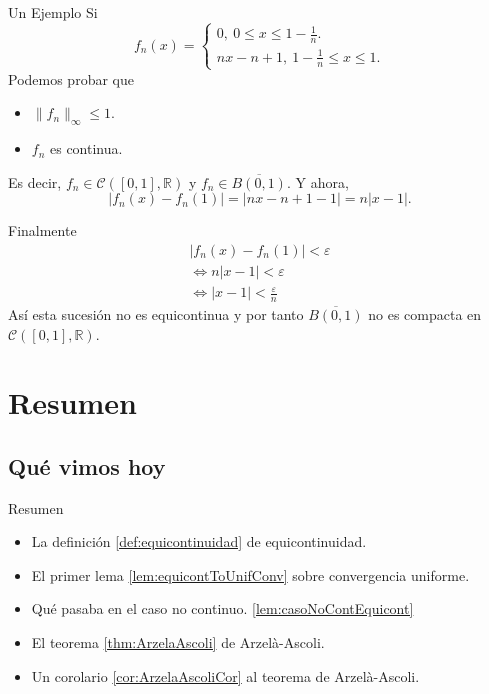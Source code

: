 \documentclass[utf8]{beamer}
\theoremstyle{plain}
\theoremstyle{definition}
\theoremstyle{remark}
\numberwithin{equation}{section}
\newcommand{\eps}{\varepsilon}          %
\newcommand{\bR}{\mathbb{R}}    %
\newcommand{\cC}{\mathcal{C}}           %
\renewcommand{\leq}{\leqslant}          %
\newcommand{\ov}{\overline}
\begin{document}
\begin{frame}{Un Ejemplo}
  Si 
$$f_n(x)=\begin{cases}
  0,\ 0\leq x\leq 1-\frac1n.\\
  nx-n+1,\ 1-\frac1n\leq x\leq 1.
\end{cases}$$
Podemos probar que

\begin{itemize}
  \item $\|f_n\|_\infty\leq 1$.
  \item $f_n$ es continua.
\end{itemize}

Es decir, $f_n\in \cC([0,1],\bR)$ y $f_n\in\ov{B(0,1)}$. Y ahora,
$$|f_n(x)-f_n(1)|=|nx-n+1-1|=n|x-1|.$$
\end{frame}

\begin{frame}
  Finalmente
  \begin{gather*}
    |f_n(x)-f_n(1)|<\eps\\
    \iff n|x-1|<\eps\\
    \iff |x-1|<\frac\eps n
  \end{gather*}
  Así esta sucesión no es equicontinua y por tanto $\ov{B(0,1)}$ no es compacta en $\cC([0,1],\bR)$.

\end{frame}
\section*{Resumen}

\subsection*{Qu\'e vimos hoy}
\begin{frame}{Resumen}

  \begin{itemize}
  \item La definición \ref{def:equicontinuidad} de equicontinuidad.
  \item El primer lema \ref{lem:equicontToUnifConv} sobre convergencia uniforme.
  \item Qué pasaba en el caso no continuo. \ref{lem:casoNoContEquicont}
  \item El teorema \ref{thm:ArzelaAscoli} de Arzelà-Ascoli.
  \item Un corolario \ref{cor:ArzelaAscoliCor} al teorema de Arzelà-Ascoli.
  \end{itemize}
  
\end{frame}
\end{document}

